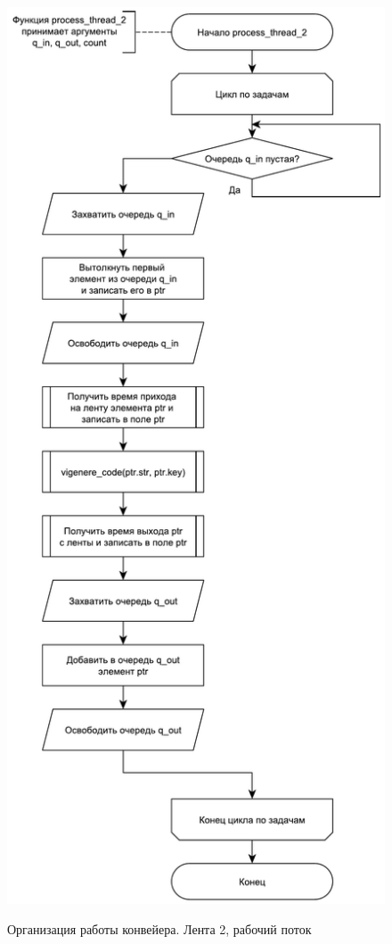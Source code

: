 \begin{figure}[pt!]
	\begin{center}
		{\includegraphics[scale = 0.55]{schemes/line_2}}
		\caption{Организация работы конвейера. Лента 2, рабочий поток}
		\label{fig6:image}
	\end{center}
\end{figure}

